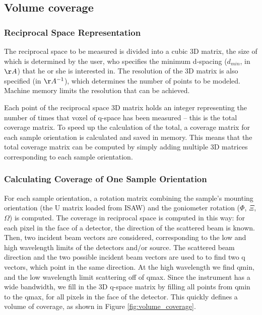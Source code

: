 \documentclass{iucr}              %
\begin{document}
  
\subsection{Volume coverage}

\subsubsection{Reciprocal Space Representation}

The reciprocal space to be measured is divided into a cubic 3D matrix, the size
of which is determined by the user, who specifies the minimum d-spacing
($d_{min}$, in $\AA$) that he or she is interested in. The resolution of the 3D
matrix is also specified (in $\AA^{-1}$), which determines the number of points to be
modeled. Machine memory limits the resolution that can be achieved.    

Each point of the reciprocal space 3D matrix holds an integer representing the 
number of times that voxel of q-space has been measured – this is the total
coverage matrix. To speed up the calculation of the total, a coverage matrix for
each sample orientation is calculated and saved in memory. This means that the
total coverage matrix can be computed by simply adding multiple 3D matrices
corresponding to each sample orientation. 
 
\subsubsection{Calculating Coverage of One Sample Orientation}


For each sample orientation, a rotation matrix combining the sample's mounting
orientation (the U matrix loaded from ISAW) and the goniometer rotation
($\Phi$, $\Xi$, $\Omega$) is computed. The coverage in reciprocal space is
computed in this way: for each pixel in the face of a detector, the direction of
the scattered beam is known. Then, two incident beam vectors are considered,
corresponding to the low and high wavelength limits of the detectors and/or
source. The scattered beam direction and the two possible incident beam vectors
are used to to find two q vectors, which point in the same direction. At the
high wavelength we find qmin, and the low wavelength limit scattering off of qmax.
Since the instrument has a wide bandwidth, we fill in the 3D q-space matrix by
filling all points from qmin to the  qmax, for all pixels in the face of the
detector. This quickly defines a volume of coverage, as shown in Figure
\ref{fig:volume_coverage}.
\end{document}
